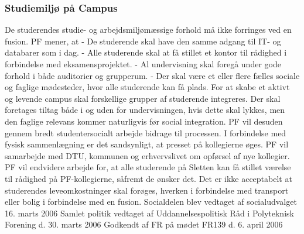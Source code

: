 \subsubsection{Studiemiljø på Campus}
De studerendes studie- og arbejdsmiljømæssige forhold må ikke forringes ved en fusion.
PF mener, at
- De studerende skal have den samme adgang til IT- og databarer som i dag.
- Alle studerende skal at få stillet et kontor til rådighed i forbindelse med eksamensprojektet.
- Al undervisning skal foregå under gode forhold i både auditorier og grupperum.
- Der skal være et eller flere fælles sociale og faglige mødesteder, hvor alle studerende kan få plads.
For at skabe et aktivt og levende campus skal forskellige grupper af studerende integreres. Der skal foretages tiltag både
i og uden for undervisningen, hvis dette skal lykkes, men den faglige relevans kommer naturligvis før social integration.
PF vil desuden gennem bredt studentersocialt arbejde bidrage til processen.
I forbindelse med fysisk sammenlægning er det sandsynligt, at presset på kollegierne øges. PF vil samarbejde med
DTU, kommunen og erhvervslivet om opførsel af nye kollegier. PF vil endvidere arbejde for, at alle studerende på
Sletten kan få stillet værelse til rådighed på PF-kollegierne, såfremt de ønsker det.
Det er ikke acceptabelt at studerendes leveomkostninger skal forøges, hverken i forbindelse med transport eller bolig i
forbindelse med en fusion.
Socialdelen blev vedtaget af socialudvalget 16. marts 2006
Samlet politik vedtaget af Uddannelsespolitisk Råd i Polyteknisk Forening d. 30. marts 2006
Godkendt af FR på mødet FR139 d. 6. april 2006
